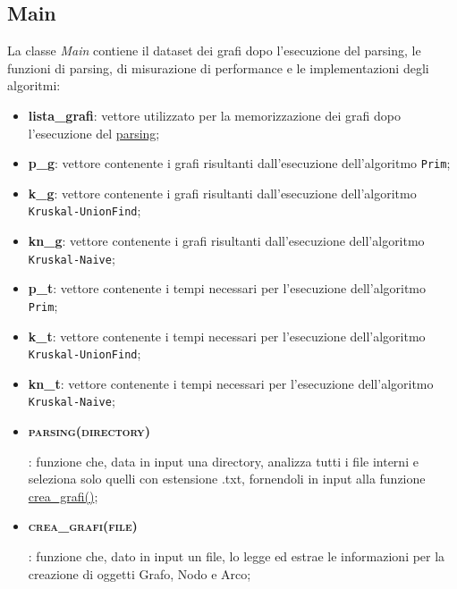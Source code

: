 \subsection{Main}
\label{Main}

La classe \textit{Main} contiene il dataset dei grafi dopo l'esecuzione del parsing, le funzioni di parsing, di misurazione di performance e le implementazioni degli algoritmi:

\begin{itemize}
    
    \item \textbf{lista\_grafi}: vettore utilizzato per la memorizzazione dei grafi dopo l'esecuzione del \hyperlink{parsing}{parsing};
    
    \item \textbf{p\_g}: vettore contenente i grafi risultanti dall'esecuzione dell'algoritmo \texttt{Prim};
    
    \item \textbf{k\_g}: vettore contenente i grafi risultanti dall'esecuzione dell'algoritmo \texttt{Kruskal-UnionFind};
    
    \item \textbf{kn\_g}: vettore contenente i grafi risultanti dall'esecuzione dell'algoritmo \texttt{Kruskal-Naive};
    
    \item \textbf{p\_t}: vettore contenente i tempi necessari per l'esecuzione dell'algoritmo \texttt{Prim};
    
    \item \textbf{k\_t}: vettore contenente i tempi necessari per l'esecuzione dell'algoritmo \texttt{Kruskal-UnionFind};
    
    \item \textbf{kn\_t}: vettore contenente i tempi necessari per l'esecuzione dell'algoritmo \texttt{Kruskal-Naive};

    \item \hypertarget{parsing}{\textbf{\textsc{parsing(directory)}}}: funzione che, data in input una directory, analizza tutti i file interni e seleziona solo quelli con estensione .txt, fornendoli in input alla funzione \hyperlink{creagrafi}{crea\_grafi()};
    
    \item \hypertarget{creagrafi}{\textbf{\textsc{crea\_grafi(file)}}}: funzione che, dato in input un file, lo legge ed estrae le informazioni per la creazione di oggetti Grafo, Nodo e Arco;
    

\end{itemize}
